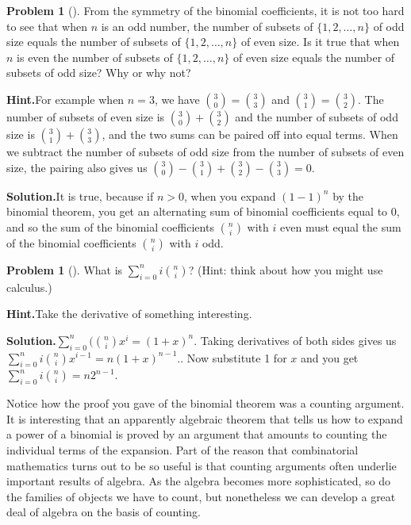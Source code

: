 \documentclass[10pt,]{book}
\theoremstyle{plain}
\theoremstyle{definition}
\newtheorem{activity}[project]{Problem}
\theoremstyle{definition}
\numberwithin{equation}{chapter}
\begin{document}
\begin{activity}[]\label{activity-58}
From the symmetry of the binomial coefficients, it is not too hard to see that when \(n\) is an odd number, the number of subsets of \(\{1,2,\ldots,n\}\) of odd size equals the number of subsets of \(\{1,2,\ldots,n\}\) of even size. Is it true that when \(n\) is even the number of subsets of \(\{1,2,\ldots,n\}\) of even size equals the number of subsets of odd size? Why or why not?%
\par\medskip\noindent%
\textbf{Hint.}\quad For example when \(n = 3\), we have \(\binom{3}{0} = \binom{3}{3}\) and \(\binom{3}{1} = \binom{3}{2}\).  The number of subsets of even size is \(\binom{3}{0}+\binom{3}{2}\) and the number of subsets of odd size is \(\binom{3}{1} + \binom{3}{3}\), and the two sums can be paired off into equal terms.  When we subtract the number of subsets of odd size from the number of subsets of even size, the pairing also gives us \(\binom{3}{0} - \binom{3}{1} + \binom{3}{2} - \binom{3}{3} =
0\).%
\par\medskip\noindent%
\textbf{Solution.}\quad It is true, because if \(n>0\), when you expand \((1-1)^n\) by the binomial theorem, you get an alternating sum of binomial coefficients equal to 0, and so the sum of the binomial coefficients \(\binom{n}{i}\) with \(i\) even must equal the sum of the binomial coefficients \(\binom{n}{i}\) with \(i\) odd.%
\end{activity}
\begin{activity}[]\label{activity-59}
What is \(\sum_{i=0}^n i\binom{n}{i}\)? (Hint: think about how you might use calculus.)%
\par\medskip\noindent%
\textbf{Hint.}\quad Take the derivative of something interesting.%
\par\medskip\noindent%
\textbf{Solution.}\quad \(\sum_{i=0}^n(\binom{n}{i}x^i = (1+x)^n\). Taking derivatives of both sides gives us \(\sum_{i=0}^ni\binom{n}{i}x^{i-1} = n(1+x)^{n-1}.\). Now substitute 1 for \(x\) and you get \(\sum_{i=0}^n i\binom{n}{i} = n2^{n-1}\).%
\end{activity}
Notice how the proof you gave of the binomial theorem was a counting argument. It is interesting that an apparently algebraic theorem that tells us how to expand a power of a binomial is proved by an argument that amounts to counting the individual terms of the expansion. Part of the reason that combinatorial mathematics turns out to be so useful is that counting arguments often underlie important results of algebra. As the algebra becomes more sophisticated, so do the families of objects we have to count, but nonetheless we can develop a great deal of algebra on the basis of counting.%
\typeout{************************************************}
\typeout{************************************************}
\end{document}
